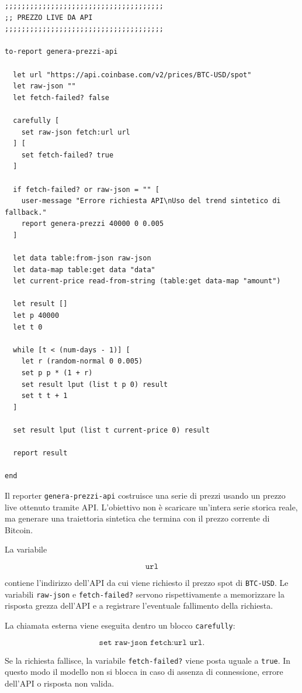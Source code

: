 \begin{lstlisting}[caption={Reporter per la costruzione di una serie prezzi con prezzo finale live da API}]
;;;;;;;;;;;;;;;;;;;;;;;;;;;;;;;;;;;;;;
;; PREZZO LIVE DA API
;;;;;;;;;;;;;;;;;;;;;;;;;;;;;;;;;;;;;;

to-report genera-prezzi-api

  let url "https://api.coinbase.com/v2/prices/BTC-USD/spot"
  let raw-json ""
  let fetch-failed? false

  carefully [
    set raw-json fetch:url url
  ] [
    set fetch-failed? true
  ]

  if fetch-failed? or raw-json = "" [
    user-message "Errore richiesta API\nUso del trend sintetico di fallback."
    report genera-prezzi 40000 0 0.005
  ]

  let data table:from-json raw-json
  let data-map table:get data "data"
  let current-price read-from-string (table:get data-map "amount")

  let result []
  let p 40000
  let t 0

  while [t < (num-days - 1)] [
    let r (random-normal 0 0.005)
    set p p * (1 + r)
    set result lput (list t p 0) result
    set t t + 1
  ]

  set result lput (list t current-price 0) result

  report result

end
\end{lstlisting}

Il reporter \texttt{genera-prezzi-api} costruisce una serie di prezzi usando un
prezzo live ottenuto tramite API. L'obiettivo non è scaricare un'intera serie
storica reale, ma generare una traiettoria sintetica che termina con il prezzo
corrente di Bitcoin.

La variabile

\[
\texttt{url}
\]

contiene l'indirizzo dell'API da cui viene richiesto il prezzo spot di
\texttt{BTC-USD}. Le variabili \texttt{raw-json} e \texttt{fetch-failed?}
servono rispettivamente a memorizzare la risposta grezza dell'API e a registrare
l'eventuale fallimento della richiesta.

La chiamata esterna viene eseguita dentro un blocco \texttt{carefully}:

\[
\texttt{set raw-json fetch:url url}.
\]

Se la richiesta fallisce, la variabile \texttt{fetch-failed?} viene posta uguale
a \texttt{true}. In questo modo il modello non si blocca in caso di assenza di
connessione, errore dell'API o risposta non valida.

